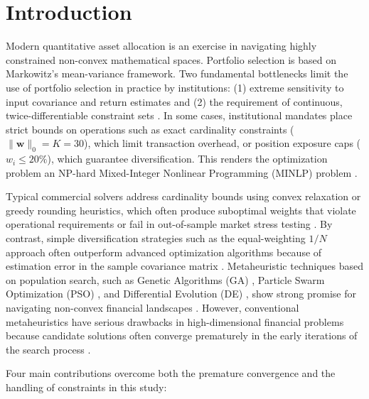 \documentclass[11pt,a4paper]{article}
\begin{document}
\section{Introduction}

Modern quantitative asset allocation is an exercise in navigating highly constrained non-convex mathematical spaces. Portfolio selection is based on Markowitz's \cite{markowitz1952} mean-variance framework. Two fundamental bottlenecks limit the use of portfolio selection in practice by institutions: (1) extreme sensitivity to input covariance and return estimates \cite{olmo2023} and (2) the requirement of continuous, twice-differentiable constraint sets \cite{li2024cardinality}. In some cases, institutional mandates place strict bounds on operations such as exact cardinality constraints ($\|\mathbf{w}\|_0 = K = 30$), which limit transaction overhead, or position exposure caps ($w_i \le 20\%$), which guarantee diversification. This renders the optimization problem an NP-hard Mixed-Integer Nonlinear Programming (MINLP) problem \cite{li2024cardinality}.

Typical commercial solvers address cardinality bounds using convex relaxation or greedy rounding heuristics, which often produce suboptimal weights that violate operational requirements or fail in out-of-sample market stress testing \cite{bertsimas1999, fabozzi2007}. By contrast, simple diversification strategies such as the equal-weighting $1/N$ approach often outperform advanced optimization algorithms because of estimation error in the sample covariance matrix \cite{demiguel2009}. Metaheuristic techniques based on population search, such as Genetic Algorithms (GA) \cite{holland1992}, Particle Swarm Optimization (PSO) \cite{kennedy1995}, and Differential Evolution (DE) \cite{storn1997}, show strong promise for navigating non-convex financial landscapes \cite{zheng2023}. However, conventional metaheuristics have serious drawbacks in high-dimensional financial problems because candidate solutions often converge prematurely in the early iterations of the search process \cite{bailey2024}.

Four main contributions overcome both the premature convergence and the handling of constraints in this study:
\end{document}
